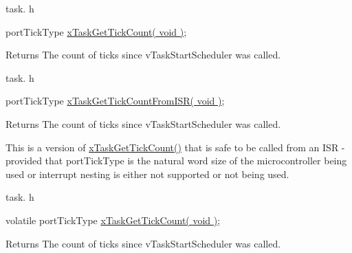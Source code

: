 task. h 
\begin{DoxyPre}portTickType \hyperlink{win32_2win32_2_libraries_2_free_r_t_o_s_2_source_2tasks_8c_a50ca04677e139ae017188939edc33144}{xTaskGetTickCount( void )};\end{DoxyPre}


\begin{DoxyReturn}{Returns}
The count of ticks since v\-Task\-Start\-Scheduler was called.
\end{DoxyReturn}
task. h 
\begin{DoxyPre}portTickType \hyperlink{task_8c_aa1ecfd8dd05e4f5d0b825ce1b45cb388}{xTaskGetTickCountFromISR( void )};\end{DoxyPre}


\begin{DoxyReturn}{Returns}
The count of ticks since v\-Task\-Start\-Scheduler was called.
\end{DoxyReturn}
This is a version of \hyperlink{_common_2_libraries_2_free_r_t_o_s_2_source_2include_2task_8h_a25ba1c4490c7e3ae11bc1e25192b12dc}{x\-Task\-Get\-Tick\-Count()} that is safe to be called from an I\-S\-R -\/ provided that port\-Tick\-Type is the natural word size of the microcontroller being used or interrupt nesting is either not supported or not being used.

task. h 
\begin{DoxyPre}volatile portTickType \hyperlink{win32_2win32_2_libraries_2_free_r_t_o_s_2_source_2tasks_8c_a50ca04677e139ae017188939edc33144}{xTaskGetTickCount( void )};\end{DoxyPre}


\begin{DoxyReturn}{Returns}
The count of ticks since v\-Task\-Start\-Scheduler was called. 
\end{DoxyReturn}
